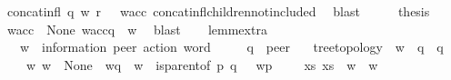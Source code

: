 \begin{isabellebody}
\ {\isacartoucheopen}concat{\isacharunderscore}{\kern0pt}infl\ q\ w\ {\isacharparenleft}{\kern0pt}r\ {\isacharhash}{\kern0pt}\ {\isasymepsilon}{\isacharparenright}{\kern0pt}\ w{\isacharunderscore}{\kern0pt}acc{\isacartoucheclose}\ concat{\isacharunderscore}{\kern0pt}infl{\isacharunderscore}{\kern0pt}children{\isacharunderscore}{\kern0pt}not{\isacharunderscore}{\kern0pt}included\ \isamarkupfalse%
\ blast\isanewline
\ \ \isamarkupfalse%
\ \isamarkupfalse%
\ {\isacharquery}{\kern0pt}thesis\ \isamarkupfalse%
\ {\isacartoucheopen}w{\isacharunderscore}{\kern0pt}acc\ {\isasymin}\ {\isasymT}\isactrlbsub None\isactrlesub {\isacartoucheclose}\ {\isacartoucheopen}w{\isacharunderscore}{\kern0pt}acc{\isasymdown}\isactrlsub q\ {\isacharequal}{\kern0pt}\ w{\isacartoucheclose}\ \isamarkupfalse%
\ blast\isanewline
{}\isamarkupfalse%
%
\endisatagproof
{\isafoldproof}%
%
\isadelimproof
\isanewline
%
\endisadelimproof
\ \ \isanewline
\isanewline
\isanewline
\isanewline
{}\isamarkupfalse%
\ lemm{}{\isacharunderscore}{\kern0pt}{}{\isacharunderscore}{\kern0pt}extra{\isacharcolon}{\kern0pt}\isanewline
\ \ \ w\ {\isacharcolon}{\kern0pt}{\isacharcolon}{\kern0pt}\ {\isachardoublequoteopen}{\isacharparenleft}{\kern0pt}{\isacharprime}{\kern0pt}information{\isacharcomma}{\kern0pt}\ {\isacharprime}{\kern0pt}peer{\isacharparenright}{\kern0pt}\ action\ word{\isachardoublequoteclose}\isanewline
\ \ \ \ \ q\ {\isacharcolon}{\kern0pt}{\isacharcolon}{\kern0pt}\ {\isachardoublequoteopen}{\isacharprime}{\kern0pt}peer{\isachardoublequoteclose}\isanewline
\ \ \ {\isachardoublequoteopen}tree{\isacharunderscore}{\kern0pt}topology{\isachardoublequoteclose}\ \ {\isachardoublequoteopen}w\ {\isasymin}\ {\isasymL}\isactrlsup {\isacharasterisk}{\kern0pt}{\isacharparenleft}{\kern0pt}q{\isacharparenright}{\kern0pt}{\isachardoublequoteclose}\ \ {\isachardoublequoteopen}q\ {\isasymin}\ {\isasymP}{\isachardoublequoteclose}\isanewline
\ \ \ {\isachardoublequoteopen}{\isasymexists}\ w{\isacharprime}{\kern0pt}{\isachardot}{\kern0pt}\ {\isacharparenleft}{\kern0pt}w{\isacharprime}{\kern0pt}\ {\isasymin}\ {\isasymT}\isactrlbsub None\isactrlesub \ {\isasymand}\ w{\isacharprime}{\kern0pt}{\isasymdown}\isactrlsub q\ {\isacharequal}{\kern0pt}\ w\ {\isasymand}\ {\isacharparenleft}{\kern0pt}{\isacharparenleft}{\kern0pt}is{\isacharunderscore}{\kern0pt}parent{\isacharunderscore}{\kern0pt}of\ p\ q{\isacharparenright}{\kern0pt}\ {\isasymlongrightarrow}\ \ w{\isacharprime}{\kern0pt}{\isasymdown}\isactrlsub p\ {\isacharequal}{\kern0pt}\ {\isasymepsilon}{\isacharparenright}{\kern0pt}{\isacharparenright}{\kern0pt}\ {\isasymand}\ {\isacharparenleft}{\kern0pt}{\isasymexists}\ xs{\isachardot}{\kern0pt}\ {\isacharparenleft}{\kern0pt}xs\ {\isacharat}{\kern0pt}\ w{\isacharparenright}{\kern0pt}\ {\isacharequal}{\kern0pt}\ w{\isacharprime}{\kern0pt}{\isacharparenright}{\kern0pt}{\isachardoublequoteclose}\isanewline

\end{isabellebody}
